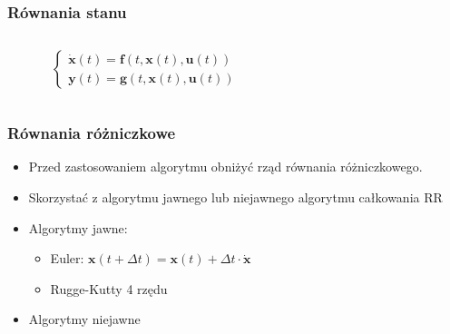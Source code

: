 \documentclass[aspectratio=169]{beamer}
\begin{document}
\begin{frame}%
	\frametitle{Równania stanu}
	\begin{columns}
		\begin{column}{0.3\textwidth}
	      		 	\uncover<1->{\[
				\begin{cases}
					\dot{\bm{x}} \left(t\right)  = \bm{Ax} \left(t\right)  + \bm{Bu} \left(t\right) \\
					\bm{y} \left(t\right) = \bm{Cx} \left(t\right) + \bm{Du} \left(t\right)
				\end{cases}
				\]}	
	      		 	\[
				\begin{cases}
					\dot{\bm{x}} \left(t\right)  = \bm{f} \left(t,\bm{x}\left(t\right),\bm{u}\left(t\right) \right) \\
					\bm{y} \left(t\right) = \bm{g} \left(t,\bm{x}\left(t\right),\bm{u}\left(t\right) \right)
				\end{cases}
				\]	
		\end{column}
		\begin{column}{0.7\textwidth}
	   	 	\begin{figure}
	   		 \centering
	    		\end{figure}
		\end{column}
	\end{columns}
\end{frame}

\begin{frame}%
	\frametitle{Równania różniczkowe}
	\begin{itemize}
	  \item{
	    Przed zastosowaniem algorytmu obniżyć rząd równania różniczkowego.
	    \pause
	  }
	  \item {   
	    Skorzystać z algorytmu jawnego lub niejawnego algorytmu całkowania RR
	    \pause
	  }
	  \item {
	    Algorytmy jawne:
	    \pause
	    \begin{itemize}
		  \item{
		    Euler: $\bm{x}\left(t + \Delta t\right) = \bm{x}\left(t\right) + \Delta t \cdot \bm{\dot{x}} $
		    \pause
		  }
		  \item {   
		    Rugge-Kutty 4 rzędu
		  }
	     \end{itemize}
	     \pause
	  }
	  \item {   
	    Algorytmy niejawne
	  }
 	 \end{itemize}
\end{frame}
\end{document}
